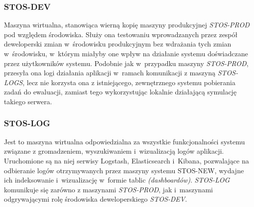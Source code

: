 \subsubsection{STOS-DEV}
Maszyna wirtualna, stanowiąca wierną kopię maszyny produkcyjnej \textit{STOS-PROD} pod względem środowiska. Służy ona testowaniu wprowadzanych przez zespół deweloperski zmian w~środowisku produkcyjnym bez wdrażania tych zmian w~środowisku, w~którym miałyby one wpływ na działanie systemu doświadczane przez użytkowników systemu. Podobnie jak w~przypadku maszyny \textit{STOS-PROD}, przesyła ona logi działania aplikacji w~ramach komunikacji z maszyną \textit{STOS-LOGS}, lecz nie korzysta ona z istniejącego, zewnętrznego systemu pobierania zadań do ewaluacji, zamiast tego wykorzystując lokalnie działającą symulację takiego serwera.

\subsubsection{STOS-LOG}
Jest to maszyna wirtualna odpowiedzialna za wszystkie funkcjonalności systemu związane z gromadzeniem, wyszukiwaniem i~wizualizacją logów aplikacji. Uruchomione są na niej serwisy Logstash, Elasticsearch i~Kibana, pozwalające na odbieranie logów otrzymywanych przez maszyny systemu STOS-NEW, wydajne ich indeksowanie i~wizualizację w~formie tablic \textit{(dashboardów)}. \textit{STOS-LOG} komunikuje się zarówno z maszynami \textit{STOS-PROD}, jak i~maszynami odgrywającymi rolę środowiska deweloperskiego \textit{STOS-DEV}. 

